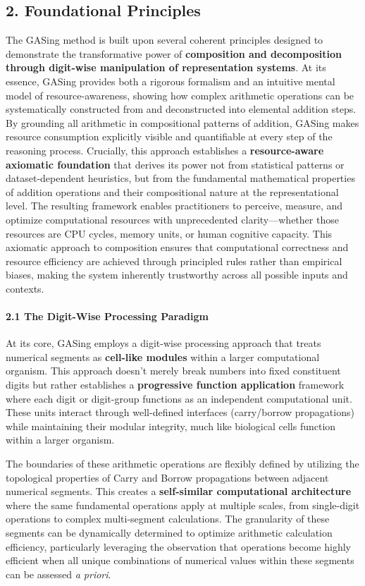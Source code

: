 \documentclass[11pt,a4paper]{article}
\begin{document}
\subsection{2. Foundational Principles}
The GASing method is built upon several coherent principles designed to demonstrate the transformative power of \textbf{composition and decomposition through digit-wise manipulation of representation systems}. At its essence, GASing provides both a rigorous formalism and an intuitive mental model of resource-awareness, showing how complex arithmetic operations can be systematically constructed from and deconstructed into elemental addition steps. By grounding all arithmetic in compositional patterns of addition, GASing makes resource consumption explicitly visible and quantifiable at every step of the reasoning process. Crucially, this approach establishes a \textbf{resource-aware axiomatic foundation} that derives its power not from statistical patterns or dataset-dependent heuristics, but from the fundamental mathematical properties of addition operations and their compositional nature at the representational level. The resulting framework enables practitioners to perceive, measure, and optimize computational resources with unprecedented clarity—whether those resources are CPU cycles, memory units, or human cognitive capacity. This axiomatic approach to composition ensures that computational correctness and resource efficiency are achieved through principled rules rather than empirical biases, making the system inherently trustworthy across all possible inputs and contexts.

\paragraph{2.1 The Digit-Wise Processing Paradigm}
At its core, GASing employs a digit-wise processing approach that treats numerical segments as \textbf{cell-like modules} within a larger computational organism. This approach doesn't merely break numbers into fixed constituent digits but rather establishes a \textbf{progressive function application} framework where each digit or digit-group functions as an independent computational unit. These units interact through well-defined interfaces (carry/borrow propagations) while maintaining their modular integrity, much like biological cells function within a larger organism.

The boundaries of these arithmetic operations are flexibly defined by utilizing the topological properties of Carry and Borrow propagations between adjacent numerical segments. This creates a \textbf{self-similar computational architecture} where the same fundamental operations apply at multiple scales, from single-digit operations to complex multi-segment calculations. The granularity of these segments can be dynamically determined to optimize arithmetic calculation efficiency, particularly leveraging the observation that operations become highly efficient when all unique combinations of numerical values within these segments can be assessed \emph{a priori}. 
\end{document}
